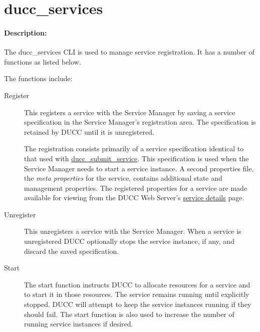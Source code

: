 \ifpdf
\else
{}
\fi
    \section{ducc\_services}
    \label{sec:cli.ducc-services}

    \paragraph{Description:}

        The ducc\_services CLI is used to manage service registration. It has a number of functions 
        as listed below.
        
        The functions include: 
        \begin{description}
            \item[Register] This registers a service with the Service Manager by saving a service
              specification in the Service Manager's registration area. The specification is
              retained by DUCC until it is unregistered.

              The registration consists primarily of a service specification identical to that used
              with \hyperref[sec:cli.service-submit]{ducc\_submit\_service}.  This specification is
              used when the Service Manager needs to start a service instance.  A second properties
              file, the {\em meta properties} for the service, contains additional state and
              management properties.  The registered properties for a service are made available for
              viewing from the DUCC Web Server's \hyperref[sec:ws-service-details]{service details}
              page.
              
            \item[Unregister] This unregisters a service with the Service Manager. When a service is
              unregistered DUCC optionally stops the service instance, if any, and discard the
              saved specification.
              
            \item[Start] The start function instructs DUCC to allocate resources for a service and to
              start it in those resources. The service remains running until explicitly stopped. DUCC
              will attempt to keep the service instances running if they should fail. The start function
              is also used to increase the number of running service instances if desired.
              

\end{description}
